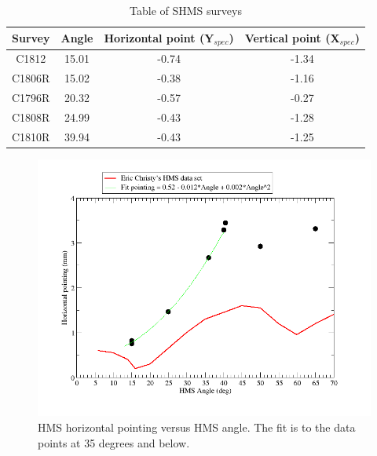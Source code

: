 \documentclass[]{article}
\begin{document}
			 	\begin{table}[h]
				\begin{center}
						\begin{tabular}[]{|c|c||c|c|} \hline\hline
		Survey & Angle  & Horizontal point (Y$_{spec}$) & Vertical point (X$_{spec}$)\\ \hline
		C1812  & 15.01  & -0.74 & -1.34 \\ \hline
		C1806R & 15.02 & -0.38 & -1.16 \\ \hline
		C1796R & 20.32 & -0.57& -0.27\\ \hline
		C1808R & 24.99  & -0.43 & -1.28 \\ \hline
		C1810R & 39.94  & -0.43 & -1.25 \\ \hline
		 		 	\end{tabular}
	\caption{Table of SHMS surveys}
	\label{tab:shms}
				\end{center}
				
	
		\end{table}
		\begin{figure}[h]	
			\begin{center}
				\includegraphics[width=0.8\columnwidth]{hms_horizontal_pointing.png}
			\end{center}
			\caption{HMS horizontal pointing versus HMS angle. The fit is to the data points at 35 degrees and below. }
			\label{fig:hms_horz_pointing}
		\end{figure}
		
\end{document}
